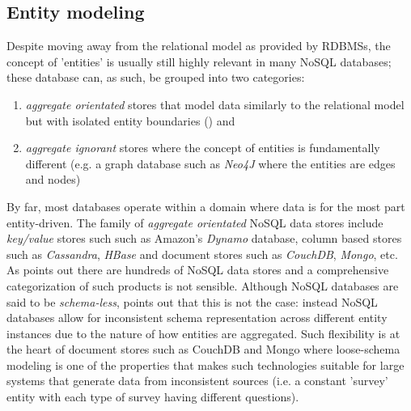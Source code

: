 \subsection{Entity modeling}
Despite moving away from the relational model as provided by RDBMSs, the concept of 'entities' is usually still highly relevant in many NoSQL databases; these database can, as such, be grouped into two categories:

\begin{enumerate}
    \item \textit{aggregate orientated} stores that model data similarly to the relational model but with isolated entity boundaries (\cite{fowlerAggregate}) and
    \item \textit{aggregate ignorant} stores where the concept of entities is fundamentally different (e.g. a graph database such as \textit{Neo4J} where the entities are edges and nodes)
\end{enumerate}

By far, most databases operate within a domain where data is for the most part entity-driven. The family of \textit{aggregate orientated} NoSQL data stores include \textit{key/value} stores such such as Amazon's \textit{Dynamo} database, column based stores such as \textit{Cassandra}, \textit{HBase} and document stores such as \textit{CouchDB}, \textit{Mongo}, etc. As \cite{GANESHCHANDRA201513} points out there are hundreds of NoSQL data stores and a comprehensive categorization of such products is not sensible. Although NoSQL databases are said to be \textit{schema-less}, \cite{ATZENI2016} points out that this is not the case: instead NoSQL databases allow for inconsistent schema representation across different entity instances due to the nature of how entities are aggregated. Such flexibility is at the heart of document stores such as CouchDB and Mongo where loose-schema modeling is one of the properties that makes such technologies suitable for large systems that generate data from inconsistent sources (i.e. a constant 'survey' entity with each type of survey having different questions).

